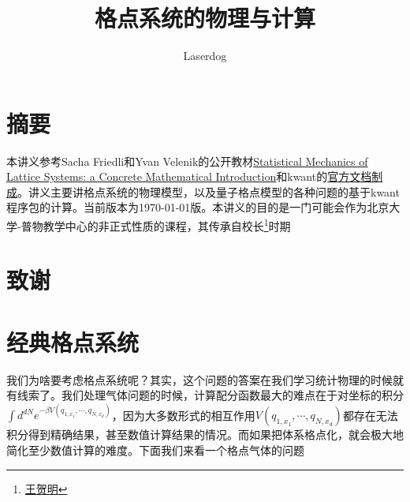 \documentclass[12pt,openany]{book}
\title{{\bf \Huge 格点系统的物理与计算}}
\author{\normalsize
Laserdog}
\begin{document}
\setlength{\baselineskip}{16pt}
\begin{titlepage}
\maketitle

\thispagestyle{empty}
\setcounter{page}{0}
\end{titlepage}

\renewcommand{\thefootnote}{\arabic{footnote}}

\frontmatter


\chapter{摘要}

本讲义参考Sacha Friedli和Yvan Velenik的公开教材\href{http://www.unige.ch/math/folks/velenik/smbook/}{Statistical Mechanics of Lattice Systems: a Concrete Mathematical Introduction}和kwant的\href{https://downloads.kwant-project.org/doc/kwant-doc-1.1.1.pdf}{官方文档制成}。讲义主要讲格点系统的物理模型，以及量子格点模型的各种问题的基于kwant程序包的计算。当前版本为\today 版。本讲义的目的是一门可能会作为北京大学-普物教学中心的非正式性质的课程，其传承自校长\footnote{\href{https://www.researchgate.net/profile/Heming_Wang}{王贺明}}时期


\chapter{致谢}




\newpage 
\tableofcontents
\cleardoublepage

\mainmatter

\chapter{经典格点系统}

我们为啥要考虑格点系统呢？其实，这个问题的答案在我们学习统计物理的时候就有线索了。我们处理气体问题的时候，计算配分函数最大的难点在于对坐标的积分$\int d^{dN}e^{-\beta V(q_{1,x_1},\cdots,q_{N,x_d})}$，因为大多数形式的相互作用$V(q_{1,x_1},\cdots,q_{N,x_d})$都存在无法积分得到精确结果，甚至数值计算结果的情况。而如果把体系格点化，就会极大地简化至少数值计算的难度。下面我们来看一个格点气体的问题
\end{document}
